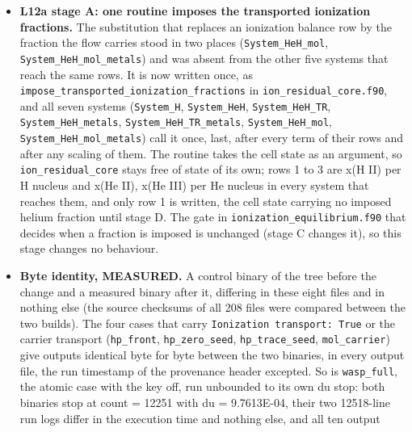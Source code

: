 \documentclass[english,a4paper]{my_memo}
\begin{document}
\begin{itemize}
  whatever its tier -\/- and gained the tiers \texttt{tier2k} (a certified case of the
  same physics at another K\_zz) and \texttt{tier4k} (the archive at another K\_zz),
  because from the certified 3.5 state rescaled onto 0.55 (a factor 6.4) the
  element relaxation found no admissible advance while the certified
  \texttt{kzz1e10/HeH0.55} is the same composition one eddy coefficient away.
  \texttt{-\/-list\ N} prints plain lines.
\item
  \textbf{L12a stage A: one routine imposes the transported ionization
  fractions.} The substitution that replaces an ionization balance row by
  the fraction the flow carries stood in two places
  (\texttt{System\_HeH\_mol}, \texttt{System\_HeH\_mol\_metals}) and was absent from the other
  five systems that reach the same rows. It is now written once, as
  \texttt{impose\_transported\_ionization\_fractions} in \texttt{ion\_residual\_core.f90}, and
  all seven systems (\texttt{System\_H}, \texttt{System\_HeH}, \texttt{System\_HeH\_TR},
  \texttt{System\_HeH\_metals}, \texttt{System\_HeH\_TR\_metals}, \texttt{System\_HeH\_mol},
  \texttt{System\_HeH\_mol\_metals}) call it once, last, after every term of their
  rows and after any scaling of them. The routine takes the cell state as an
  argument, so \texttt{ion\_residual\_core} stays free of state of its own; rows 1 to
  3 are x(H II) per H nucleus and x(He II), x(He III) per He nucleus in
  every system that reaches them, and only row 1 is written, the cell state
  carrying no imposed helium fraction until stage D. The gate in
  \texttt{ionization\_equilibrium.f90} that decides when a fraction is imposed is
  unchanged (stage C changes it), so this stage changes no behaviour.
\item
  \textbf{Byte identity, MEASURED.} A control binary of the tree before the
  change and a measured binary after it, differing in these eight files and
  in nothing else (the source checksums of all 208 files were compared
  between the two builds). The four cases that carry
  \texttt{Ionization\ transport:\ True} or the carrier transport
  (\texttt{hp\_front}, \texttt{hp\_zero\_seed}, \texttt{hp\_trace\_seed}, \texttt{mol\_carrier}) give outputs
  identical byte for byte between the two binaries, in every output file,
  the run timestamp of the provenance header excepted. So is \texttt{wasp\_full},
  the atomic case with the key off, run unbounded to its own du stop: both
  binaries stop at count = 12251 with du = 9.7613E-04, their two 12518-line
  run logs differ in the execution time and nothing else, and all ten output

\end{itemize}
\end{document}
